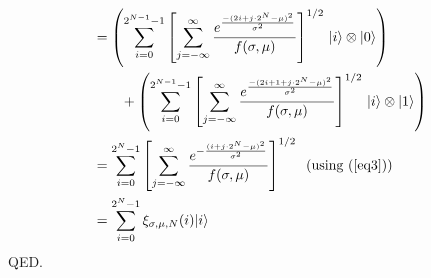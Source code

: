 \documentclass[11pt]{article}
\begin{document}
\begin{align*}
&= \left( \sum_{i=0}^{2^{N-1} - 1} \left[ \sum_{j=-\infty}^{\infty} \frac{e^{\frac{-( 2i + j \cdot 2^{N} - \mu)^2}{\sigma^2}}} {f(\sigma, \mu)} \right]^{1/2} \, \vert i \rangle \otimes \vert 0 \rangle \right) \\
& \qquad + \left( \sum_{i=0}^{2^{N-1} - 1} \left[ \sum_{j=-\infty}^{\infty} \frac{e^{\frac{-( 2i + 1 + j \cdot 2^{N} - \mu)^2}{\sigma^2}}} {f(\sigma, \mu)} \right]^{1/2} \, \vert i \rangle \otimes \vert 1 \rangle \right) \\
&= \sum_{i=0}^{2^{N} - 1} \left[ \sum_{j=-\infty}^{\infty} \frac{e^{-\frac{(i + j \cdot 2^{N} - \mu)^2}{\sigma^2}}}{f(\sigma, \mu)} \right]^{1/2} \;\; (\text{using } (\ref{eq3})) \\
&= \sum_{i=0}^{2^{N} - 1} \xi_{\sigma, \mu, N} (i) \vert i \rangle
\end{align*}
QED.
 
\end{document}
